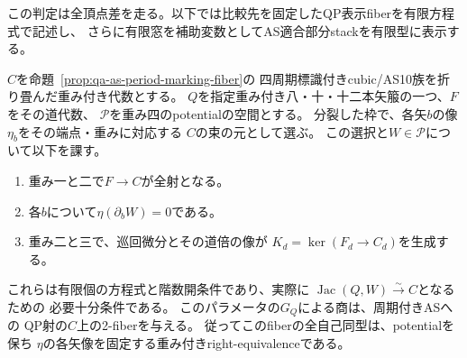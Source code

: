 この判定は全頂点差を走る。以下では比較先を固定したQP表示fiberを有限方程式で記述し、
さらに有限窓を補助変数としてAS適合部分stackを有限型に表示する。

\begin{theorem}[周期付きAS族上のQP表示fiberの有限方程式]
\label{thm:qa-periodic-as-qp-fiber}
$C$を命題~\ref{prop:qa-as-period-marking-fiber}の
四周期標識付きcubic/AS10族を折り畳んだ重み付き代数とする。
$Q$を指定重み付き八・十・十二本矢箙の一つ、$F$をその道代数、
$\mathcal P$を重み四のpotentialの空間とする。
分裂した枠で、各矢$b$の像$\eta_b$をその端点・重みに対応する
$C$の束の元として選ぶ。
この選択と$W\in\mathcal P$について以下を課す。
\begin{enumerate}
\item 重み一と二で$F\to C$が全射となる。
\item 各$b$について$\eta(\partial_bW)=0$である。
\item 重み二と三で、巡回微分とその道倍の像が
$K_d=\ker(F_d\to C_d)$を生成する。
\end{enumerate}
これらは有限個の方程式と階数開条件であり、実際に
$\operatorname{Jac}(Q,W)\xrightarrow{\sim} C$となるための
必要十分条件である。
このパラメータの$G_Q$による商は、周期付きASへの
QP射の$C$上の2-fiberを与える。
従ってこのfiberの全自己同型は、potentialを保ち
$\eta$の各矢像を固定する重み付きright-equivalenceである。
\end{theorem}
